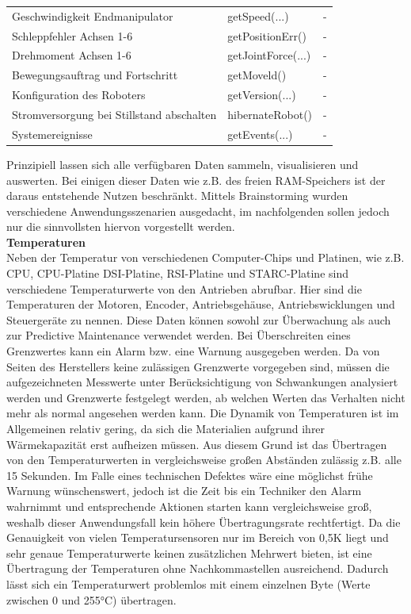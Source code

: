 \documentclass[ a4paper,
                oneside,
                toc=bibliography,
                toc=listof
                ]{scrbook}
\begin{document}
\begin{longtable}{|p{7cm}|p{3cm}|p{3cm}|}
		\hline
		Geschwindigkeit Endmanipulator & getSpeed(...) & - \\
		Schleppfehler Achsen 1-6 & getPositionErr()  & - \\
		Drehmoment Achsen 1-6 & getJointForce(...)  & - \\
		Bewegungsauftrag und Fortschritt & getMoveld()  & - \\
		Konfiguration des Roboters & getVersion(...)  & - \\
		Stromversorgung bei Stillstand abschalten & hibernateRobot()  & - \\
		Systemereignisse &getEvents(...)  & - \\
		\hline
	\end{longtable}
	

 	Prinzipiell lassen sich alle verfügbaren Daten sammeln, visualisieren und auswerten. Bei einigen dieser Daten wie z.B. des freien RAM-Speichers ist der daraus entstehende Nutzen beschränkt.	Mittels Brainstorming wurden verschiedene Anwendungsszenarien ausgedacht, im nachfolgenden sollen jedoch nur die sinnvollsten hiervon vorgestellt werden.\\
 	\textbf{Temperaturen}\\
 	Neben der Temperatur von verschiedenen Computer-Chips und Platinen, wie z.B. CPU, CPU-Platine DSI-Platine, RSI-Platine und STARC-Platine sind verschiedene Temperaturwerte von den Antrieben abrufbar. Hier sind die Temperaturen der Motoren, Encoder, Antriebsgehäuse,  Antriebswicklungen und  Steuergeräte zu nennen. Diese Daten können sowohl zur Überwachung als auch zur Predictive Maintenance verwendet werden. Bei Überschreiten eines Grenzwertes kann ein Alarm bzw. eine Warnung ausgegeben werden. Da von Seiten des Herstellers keine zulässigen Grenzwerte vorgegeben sind, müssen die aufgezeichneten Messwerte unter Berücksichtigung von Schwankungen analysiert werden und Grenzwerte festgelegt werden, ab welchen Werten das Verhalten nicht mehr als \glqq normal\grqq{} angesehen werden kann. Die Dynamik von Temperaturen ist im Allgemeinen relativ gering, da sich die Materialien aufgrund ihrer Wärmekapazität erst aufheizen müssen. Aus diesem Grund ist das Übertragen von den Temperaturwerten in vergleichsweise großen Abständen zulässig z.B. alle 15 Sekunden. Im Falle eines technischen Defektes wäre eine möglichst frühe Warnung wünschenswert, jedoch ist die Zeit bis ein Techniker den Alarm wahrnimmt und entsprechende Aktionen starten kann vergleichsweise groß, weshalb dieser Anwendungsfall kein höhere Übertragungsrate rechtfertigt. Da die Genauigkeit von vielen Temperatursensoren nur im Bereich von 0,5K liegt und sehr genaue Temperaturwerte keinen zusätzlichen Mehrwert bieten, ist eine Übertragung der Temperaturen ohne Nachkommastellen ausreichend. Dadurch lässt sich ein Temperaturwert problemlos mit einem einzelnen Byte (Werte zwischen 0 und 255°C) übertragen.\\
\end{document}
